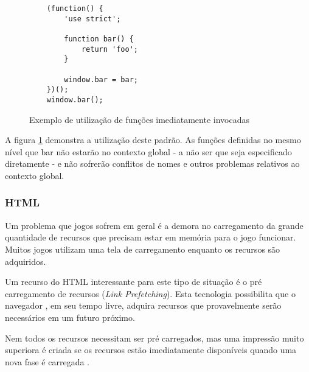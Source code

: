 \begin{figure}
\centering
\begin{verbatim}
    (function() {
        'use strict';

        function bar() {
            return 'foo';
        }

        window.bar = bar;
    })();
    window.bar();
\end{verbatim}
\caption{Exemplo de utilização de funções imediatamente invocadas}
\label{fig:iife}
\end{figure}
\begin{draft}

A figura \ref{fig:iife} demonstra a utilização deste padrão. As
funções definidas no mesmo nível que bar não estarão no contexto
global - a não ser que seja especificado diretamente - e não sofrerão
conflitos de nomes e outros problemas relativos ao contexto global.

\subsubsection{HTML}

Um problema que jogos sofrem em geral é a demora no carregamento da
grande quantidade de recursos que precisam estar em memória para o jogo
funcionar. Muitos jogos utilizam uma tela de carregamento enquanto os 
recursos são adquiridos. 

Um recurso do HTML interessante para este tipo de situação é o pré
carregamento de recursos (\textit{Link Prefetching}). Esta tecnologia
possibilita que o navegador , em seu tempo livre, adquira recursos que
provavelmente serão necessários em um futuro próximo.

Nem todos os recursos necessitam ser pré carregados, mas uma impressão
muito superiora é criada se os recursos estão imediatamente
disponíveis quando uma nova fase é carregada \autocite[pp. 39]{creatingFun}.

\end{draft}
